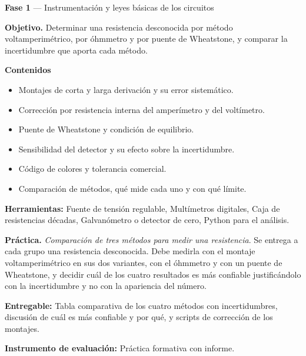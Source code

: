 \documentclass[11pt,a4paper]{article}
\begin{document}
\begin{tcolorbox}[cajaContenido,title={Semana 2 --- Determinación de una resistencia eléctrica por tres métodos}]
\textbf{Fase 1} --- Instrumentación y leyes básicas de los circuitos

\textbf{Objetivo.} Determinar una resistencia desconocida por método voltamperimétrico, por óhmmetro y por puente de Wheatstone, y comparar la incertidumbre que aporta cada método.

\textbf{Contenidos}

\begin{itemize}[leftmargin=1.4em,itemsep=2pt,topsep=3pt]
  \item Montajes de corta y larga derivación y su error sistemático.
  \item Corrección por resistencia interna del amperímetro y del voltímetro.
  \item Puente de Wheatstone y condición de equilibrio.
  \item Sensibilidad del detector y su efecto sobre la incertidumbre.
  \item Código de colores y tolerancia comercial.
  \item Comparación de métodos, qué mide cada uno y con qué límite.
\end{itemize}

\textbf{Herramientas:} Fuente de tensión regulable, Multímetros digitales, Caja de resistencias décadas, Galvanómetro o detector de cero, Python para el análisis.

\textbf{Práctica.} \emph{Comparación de tres métodos para medir una resistencia}. Se entrega a cada grupo una resistencia desconocida. Debe medirla con el montaje voltamperimétrico en sus dos variantes, con el óhmmetro y con un puente de Wheatstone, y decidir cuál de los cuatro resultados es más confiable justificándolo con la incertidumbre y no con la apariencia del número.

\textbf{Entregable:} Tabla comparativa de los cuatro métodos con incertidumbres, discusión de cuál es más confiable y por qué, y scripts de corrección de los montajes.

\textbf{Instrumento de evaluación:} Práctica formativa con informe.
\end{tcolorbox}
\end{document}
